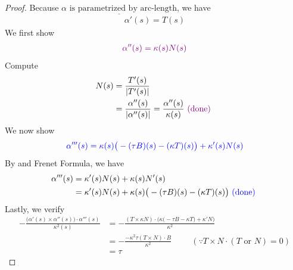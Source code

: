 \documentclass{report}
\begin{document}
\begin{proof}
Because $\underline{\alpha  \text{ is parametrized by arc-length}}$, we have 
\begin{align*}
  \alpha '(s)=T(s)
\end{align*}
We first show 
\begin{align}
\label{A''}
\textcolor{violet}{\alpha ''(s)=\kappa (s)N(s)}
\end{align}
Compute 
\begin{align*}
N(s)&=\frac{T'(s)}{\left|T'(s)\right|}\\
&=\frac{\alpha ''(s)}{\left|\alpha ''(s)\right|}=\frac{\alpha ''(s)}{\kappa (s)}\textcolor{violet}{\text{ (done) }}
\end{align*}
We now show 
\begin{align*}
\textcolor{blue}{\alpha '''(s)=\kappa(s)\big(-(\tau B)(s)-(\kappa T)(s)\big)+\kappa'(s)N(s) }
\end{align*}
By  and Frenet Formula, we have 
\begin{align*}
\alpha '''(s)&=\kappa'(s)N(s)+\kappa(s)N'(s)\\
&=\kappa'(s)N(s)+\kappa(s)\big(- (\tau B)(s)-(\kappa T)(s) \big)\textcolor{blue}{\text{ (done) }}
\end{align*}
Lastly, we verify 
\begin{align*}
-\frac{\big(\alpha '(s)\times \alpha ''(s) \big)\cdot \alpha '''(s)}{\kappa^2(s)}&=-\frac{(T\times \kappa N)\cdot \Big( \kappa \big(-\tau B-\kappa T \big)+\kappa ' N\Big) }{\kappa ^2}\\
&=-\frac{-\kappa^2 \tau (T\times N)\cdot B }{\kappa^2}\hspace{1cm}(\because T\times N \cdot (T\text{ or }N)=0)\\
&=\tau 
\end{align*}
\end{proof}
\end{document}
